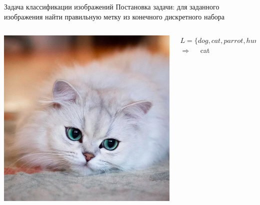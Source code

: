 \documentclass[aspectratio=169]{beamer}
\begin{document}
\begin{frame}{Задача классификации изображений}
    Постановка задачи: для заданного изображения найти правильную метку из
    конечного дискретного набора
    \vfill
    \begin{columns}
        \begin{column}{.35\linewidth}
            \includegraphics[width=\linewidth]{graphs/fig5.jpg}
        \end{column}
        \begin{column}{.65\linewidth}
            \( L = \{dog, cat, parrot, human, car, ninja, \ldots \} \) \\
            \hfill
            \vfill
            \( \Longrightarrow \quad \) cat
        \end{column}
    \end{columns}
\end{frame}
\end{document}
